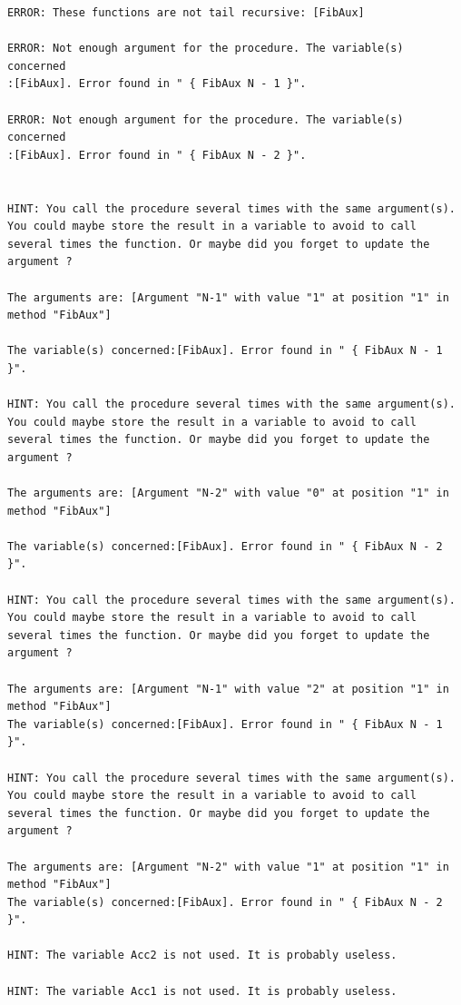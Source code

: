 \documentclass[11pt,a4paper,twoside,openright]{report}
\begin{document}
\begin{lstlisting}
ERROR: These functions are not tail recursive: [FibAux]

ERROR: Not enough argument for the procedure. The variable(s) concerned 
:[FibAux]. Error found in " { FibAux N - 1 }".

ERROR: Not enough argument for the procedure. The variable(s) concerned 
:[FibAux]. Error found in " { FibAux N - 2 }".


HINT: You call the procedure several times with the same argument(s). You could maybe store the result in a variable to avoid to call several times the function. Or maybe did you forget to update the argument ? 

The arguments are: [Argument "N-1" with value "1" at position "1" in method "FibAux"]

The variable(s) concerned:[FibAux]. Error found in " { FibAux N - 1 }".

HINT: You call the procedure several times with the same argument(s). You could maybe store the result in a variable to avoid to call several times the function. Or maybe did you forget to update the argument ? 

The arguments are: [Argument "N-2" with value "0" at position "1" in method "FibAux"]

The variable(s) concerned:[FibAux]. Error found in " { FibAux N - 2 }".

HINT: You call the procedure several times with the same argument(s). You could maybe store the result in a variable to avoid to call several times the function. Or maybe did you forget to update the argument ? 

The arguments are: [Argument "N-1" with value "2" at position "1" in method "FibAux"]
The variable(s) concerned:[FibAux]. Error found in " { FibAux N - 1 }".

HINT: You call the procedure several times with the same argument(s). You could maybe store the result in a variable to avoid to call several times the function. Or maybe did you forget to update the argument ? 

The arguments are: [Argument "N-2" with value "1" at position "1" in method "FibAux"]
The variable(s) concerned:[FibAux]. Error found in " { FibAux N - 2 }".

HINT: The variable Acc2 is not used. It is probably useless.

HINT: The variable Acc1 is not used. It is probably useless.
\end{lstlisting}
\end{document}
